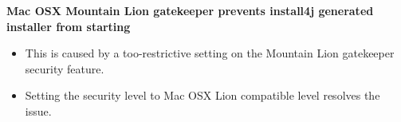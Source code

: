 
\textbf{Mac OSX Mountain Lion gatekeeper prevents install4j generated installer from starting}
\begin{itemize}
\item This is caused by a too-restrictive setting on the Mountain Lion gatekeeper security feature.
\item Setting the security level to Mac OSX Lion compatible level resolves the issue.
\end{itemize}
